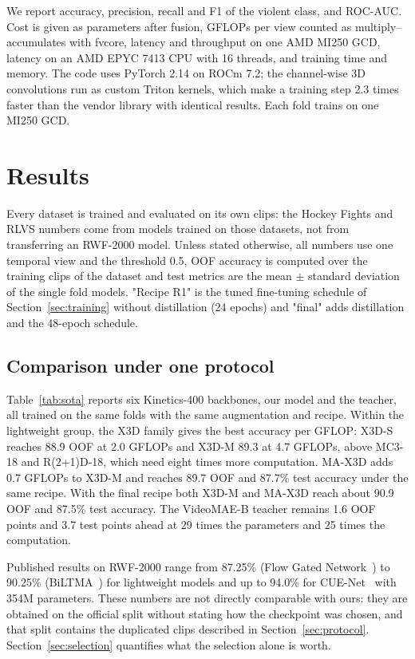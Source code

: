 \documentclass[conference]{IEEEtran}
\begin{document}
We report accuracy, precision, recall and F1 of the violent class, and
ROC-AUC. Cost is given as parameters after fusion, GFLOPs per view counted
as multiply--accumulates with fvcore, latency and throughput on one AMD
MI250 GCD, latency on an AMD EPYC 7413 CPU with 16 threads, and training
time and memory. The code uses PyTorch 2.14 on ROCm 7.2; the channel-wise
3D convolutions run as custom Triton kernels, which make a training step
2.3 times faster than the vendor library with identical results. Each fold
trains on one MI250 GCD.

\section{Results}
\label{sec:results}

Every dataset is trained and evaluated on its own clips: the Hockey
Fights and RLVS numbers come from models trained on those datasets, not
from transferring an RWF-2000 model. Unless stated otherwise, all numbers
use one temporal view and the threshold 0.5, OOF accuracy is computed over the training clips of the
dataset and test metrics are the mean $\pm$ standard deviation of the
single fold models. "Recipe R1" is the tuned fine-tuning schedule of
Section~\ref{sec:training} without distillation (24 epochs) and "final"
adds distillation and the 48-epoch schedule.

\subsection{Comparison under one protocol}

Table~\ref{tab:sota} reports six Kinetics-400 backbones, our model and the
teacher, all trained on the same folds with the same augmentation and
recipe. Within the lightweight group, the X3D family gives the best
accuracy per GFLOP: X3D-S reaches 88.9 OOF at 2.0 GFLOPs and X3D-M 89.3 at
4.7 GFLOPs, above MC3-18 and R(2+1)D-18, which need eight times more
computation. MA-X3D adds 0.7 GFLOPs to X3D-M and reaches 89.7 OOF and
87.7\% test accuracy under the same recipe. With the final recipe both
X3D-M and MA-X3D reach about 90.9 OOF and 87.5\% test accuracy. The
VideoMAE-B teacher remains 1.6 OOF points and 3.7 test points ahead at 29
times the parameters and 25 times the computation.

Published results on RWF-2000 range from 87.25\% (Flow Gated
Network~\cite{rwf2000}) to 90.25\% (BiLTMA~\cite{biltma}) for lightweight
models and up to 94.0\% for CUE-Net~\cite{cuenet} with 354M parameters.
These numbers are not directly comparable with ours: they are obtained on
the official split without stating how the checkpoint was chosen, and that
split contains the duplicated clips described in
Section~\ref{sec:protocol}. Section~\ref{sec:selection} quantifies what
the selection alone is worth.
\end{document}
